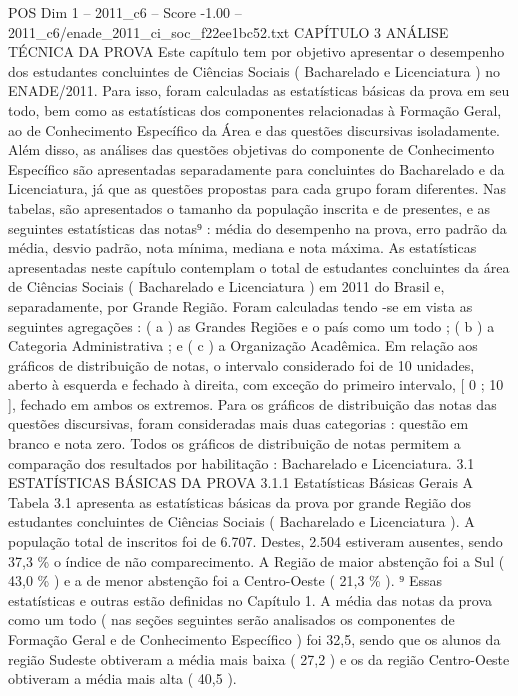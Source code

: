 \begin{textsample}{POS Dim 1 – 2011\_c6 – Score -1.00 – 2011\_c6/enade\_2011\_ci\_soc\_f22ee1bc52.txt}  \label{ex:f1_pos_214}
CAPÍTULO 3 ANÁLISE TÉCNICA DA PROVA Este capítulo tem por objetivo apresentar o desempenho dos estudantes concluintes de Ciências Sociais ( Bacharelado e Licenciatura ) no ENADE/2011.
Para isso, foram calculadas as estatísticas básicas da prova em seu todo, bem como as estatísticas dos componentes relacionadas à Formação Geral, ao de Conhecimento Específico da Área e das questões discursivas isoladamente.
Além disso, as análises das questões objetivas do componente de Conhecimento Específico são apresentadas separadamente para concluintes do Bacharelado e da Licenciatura, já que as questões propostas para cada grupo foram diferentes.
Nas tabelas, são apresentados o tamanho da população inscrita e de presentes, e as seguintes estatísticas das notas⁹ : média do desempenho na prova, erro padrão da média, desvio padrão, nota mínima, mediana e nota máxima.
As estatísticas apresentadas neste capítulo contemplam o total de estudantes concluintes da área de Ciências Sociais ( Bacharelado e Licenciatura ) em 2011 do Brasil e, separadamente, por Grande Região.
Foram calculadas tendo -se em vista as seguintes agregações : ( a ) as Grandes Regiões e o país como um todo ; ( b ) a Categoria Administrativa ; e ( c ) a Organização Acadêmica.
Em relação aos gráficos de distribuição de notas, o intervalo considerado foi de 10 unidades, aberto à esquerda e fechado à direita, com exceção do primeiro intervalo, [ 0 ; 10 ], fechado em ambos os extremos.
Para os gráficos de distribuição das notas das questões discursivas, foram consideradas mais duas categorias : questão em branco e nota zero.
Todos os gráficos de distribuição de notas permitem a comparação dos resultados por habilitação : Bacharelado e Licenciatura. 3.1 ESTATÍSTICAS BÁSICAS DA PROVA 3.1.1 Estatísticas Básicas Gerais A Tabela 3.1 apresenta as estatísticas básicas da prova por grande Região dos estudantes concluintes de Ciências Sociais ( Bacharelado e Licenciatura ).
A população total de inscritos foi de 6.707.
Destes, 2.504 estiveram ausentes, sendo 37,3 \% o índice de não comparecimento.
A Região de maior abstenção foi a Sul ( 43,0 \% ) e a de menor abstenção foi a Centro-Oeste ( 21,3 \% ). ⁹ Essas estatísticas e outras estão definidas no Capítulo 1.
A média das notas da prova como um todo ( nas seções seguintes serão analisados os componentes de Formação Geral e de Conhecimento Específico ) foi 32,5, sendo que os alunos da região Sudeste obtiveram a média mais baixa ( 27,2 ) e os da região Centro-Oeste obtiveram a média mais alta ( 40,5 ).

\end{textsample}
